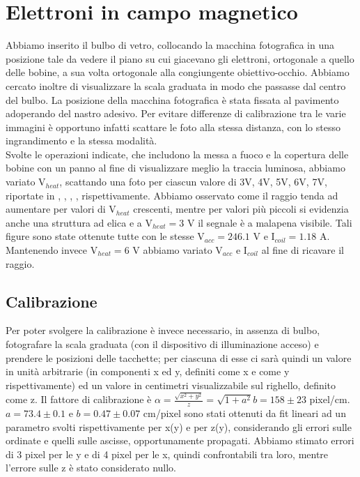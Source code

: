 \section{Elettroni in campo magnetico}
Abbiamo inserito il bulbo di vetro, collocando la macchina fotografica in una posizione tale da vedere il piano su cui giacevano gli elettroni, ortogonale a quello delle bobine, a sua volta ortogonale alla congiungente obiettivo-occhio. Abbiamo cercato inoltre di visualizzare la scala graduata in modo che passasse dal centro del bulbo. La posizione della macchina fotografica è stata fissata al pavimento adoperando del nastro adesivo. Per evitare differenze di calibrazione tra le varie immagini è opportuno infatti scattare le foto alla stessa distanza, con lo stesso ingrandimento e la stessa modalità.\\
Svolte le operazioni indicate, che includono la messa a fuoco e la copertura delle bobine con un panno al fine di visualizzare meglio la traccia luminosa, abbiamo variato V$_{heat}$, scattando una foto per ciascun valore di 3V, 4V, 5V, 6V, 7V, riportate in , , , ,  rispettivamente. Abbiamo osservato come il raggio tenda ad aumentare per valori di V$_{heat}$ crescenti, mentre per valori più piccoli si evidenzia anche una struttura ad elica e a V$_{heat} = 3$ V il segnale è a malapena visibile. Tali figure sono state ottenute tutte con le stesse V$_{acc} = 246.1$ V e I$_{coil} = 1.18$ A. Mantenendo invece V$_{heat} = 6$ V abbiamo variato V$_{acc}$ e I$_{coil}$ al fine di ricavare il raggio.\\
\subsection{Calibrazione}
Per poter svolgere la calibrazione è invece necessario, in assenza di bulbo, fotografare la scala graduata (con il dispositivo di illuminazione acceso) e prendere le posizioni delle tacchette; per ciascuna di esse ci sarà quindi un valore in unità arbitrarie (in componenti x ed y, definiti come x e come y rispettivamente) ed un valore in centimetri visualizzabile sul righello, definito come z. Il fattore di calibrazione è $\alpha = \frac{\sqrt{x^2+y^2}}{z} = {\sqrt{1+a^2}}{b} = 158 \pm 23$ pixel/cm. $a = 73.4 \pm 0.1$ e $b = 0.47 \pm 0.07$ cm/pixel sono stati ottenuti da fit lineari ad un parametro svolti rispettivamente per x(y) e per z(y), considerando gli errori sulle ordinate e quelli sulle ascisse, opportunamente propagati. Abbiamo stimato errori di 3 pixel per le y e di 4 pixel per le x, quindi confrontabili tra loro, mentre l'errore sulle z è stato considerato nullo.
